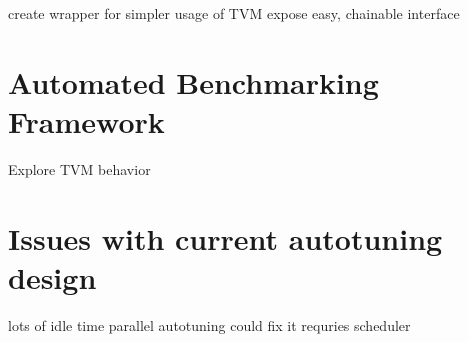 create wrapper for simpler usage of TVM
expose easy, chainable interface

\section{Automated Benchmarking Framework}
Explore TVM behavior

\section{Issues with current autotuning design}
lots of idle time
parallel autotuning could fix it
requries scheduler